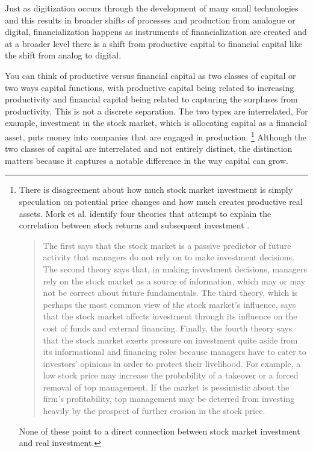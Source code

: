 Just as digitization occurs through the development of many small technologies and this results in %
broader shifts of processes and production from analogue or digital, financialization happens as instruments of financialization are created and at a broader level there is a shift from productive capital to financial capital like the shift from analog to digital. 

You can think of productive versus financial capital as two classes of capital or two ways capital functions, with productive capital being related to increasing productivity and financial capital being related to capturing the surpluses from productivity. This is not a discrete separation. The two types are interrelated, For example, investment in the stock market, which is allocating capital as a financial asset, puts money into companies that are engaged in production. \footnote{There is disagreement about how much stock market investment is simply speculation on potential price changes and how much creates productive real assets. Mork et al. identify four theories that attempt to explain the correlation between stock returns and subsequent investment \cite{morckStockMarketInvestment1990}. \begin{quotation}The first says that the stock market is a passive predictor of future activity that managers do not rely on to make investment decisions. The second theory says that, in making investment decisions, managers rely on the stock market as a source of information, which may or may not be correct about future fundamentals. The third theory, which is perhaps the most common view of the stock market's influence, says that the stock market affects investment through its influence on the cost of funds and external financing. Finally, the fourth theory says that the stock market exerts pressure on investment quite aside from its informational and financing roles because managers have to cater to investors' opinions in order to protect their livelihood. For example, a low stock price may increase the probability of a takeover or a forced removal of top management. If the market is pessimistic about the firm's profitability, top management may be deterred from investing heavily by the prospect of further erosion in the stock price.\end{quotation} None of these point to a direct connection between stock market investment and real investment.}  Although the two classes of capital are interrelated and not entirely distinct, the distinction matters because it captures a notable difference in the way capital can grow. 

